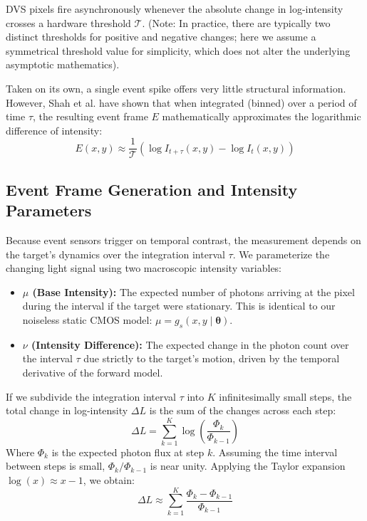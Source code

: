 \documentclass[11pt]{article}
\begin{document}
DVS pixels fire asynchronously whenever the absolute change in log-intensity crosses a hardware threshold $\mathcal{T}$. (Note: In practice, there are typically two distinct thresholds for positive and negative changes; here we assume a symmetrical threshold value for simplicity, which does not alter the underlying asymptotic mathematics).

Taken on its own, a single event spike offers very little structural information. However, Shah et al. \cite{shah2024codedevents} have shown that when integrated (binned) over a period of time $\tau$, the resulting event frame $E$ mathematically approximates the logarithmic difference of intensity:
\begin{equation}
E(x,y) \approx \frac{1}{\mathcal{T}} \left( \log I_{t+\tau}(x,y) - \log I_t(x,y) \right)
\end{equation}

\subsection{Event Frame Generation and Intensity Parameters}
Because event sensors trigger on temporal contrast, the measurement depends on the target's dynamics over the integration interval $\tau$. We parameterize the changing light signal using two macroscopic intensity variables:
\begin{itemize}
    \item \textbf{$\mu$ (Base Intensity):} The expected number of photons arriving at the pixel during the interval if the target were stationary. This is identical to our noiseless static CMOS model: $\mu = g_s(x,y \mid \bm{\theta})$.
    \item \textbf{$\nu$ (Intensity Difference):} The expected change in the photon count over the interval $\tau$ due strictly to the target's motion, driven by the temporal derivative of the forward model.
\end{itemize}

If we subdivide the integration interval $\tau$ into $K$ infinitesimally small steps, the total change in log-intensity $\Delta L$ is the sum of the changes across each step:
\begin{equation}
\Delta L = \sum_{k=1}^{K} \log \left( \frac{\Phi_{k}}{\Phi_{k-1}} \right)
\end{equation}
Where $\Phi_k$ is the expected photon flux at step $k$. Assuming the time interval between steps is small, $\Phi_k / \Phi_{k-1}$ is near unity. Applying the Taylor expansion $\log(x) \approx x - 1$, we obtain:
\begin{equation}
\Delta L \approx \sum_{k=1}^{K} \frac{\Phi_k - \Phi_{k-1}}{\Phi_{k-1}}
\end{equation}
\end{document}
